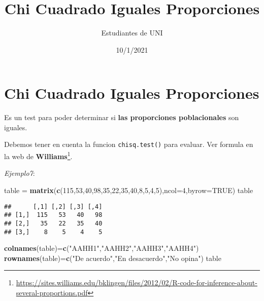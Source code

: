 \documentclass[
]{article}
\title{Chi Cuadrado Iguales Proporciones}
\author{Estudiantes de UNI}
\date{10/1/2021}
\newenvironment{Shaded}{\begin{snugshade}}{\end{snugshade}}
\newcommand{\DataTypeTok}[1]{\textcolor[rgb]{0.13,0.29,0.53}{#1}}
\newcommand{\DecValTok}[1]{\textcolor[rgb]{0.00,0.00,0.81}{#1}}
\newcommand{\KeywordTok}[1]{\textcolor[rgb]{0.13,0.29,0.53}{\textbf{#1}}}
\newcommand{\NormalTok}[1]{#1}
\newcommand{\OtherTok}[1]{\textcolor[rgb]{0.56,0.35,0.01}{#1}}
\newcommand{\StringTok}[1]{\textcolor[rgb]{0.31,0.60,0.02}{#1}}
\begin{document}
\maketitle

\hypertarget{chi-cuadrado-iguales-proporciones}{%
\section{Chi Cuadrado Iguales
Proporciones}\label{chi-cuadrado-iguales-proporciones}}

Es un test para poder determinar si \textbf{las proporciones
poblacionales} son iguales.

Debemos tener en cuenta la funcion \texttt{chisq.test()} para evaluar.
Ver formula en la web de \textbf{Williams}\footnote{\url{https://sites.williams.edu/bklingen/files/2012/02/R-code-for-inference-about-several-proportions.pdf}}.

\emph{Ejemplo7}:

\begin{Shaded}
\begin{Highlighting}[]
\NormalTok{table =}\StringTok{ }\KeywordTok{matrix}\NormalTok{(}\KeywordTok{c}\NormalTok{(}\DecValTok{115}\NormalTok{,}\DecValTok{53}\NormalTok{,}\DecValTok{40}\NormalTok{,}\DecValTok{98}\NormalTok{,}\DecValTok{35}\NormalTok{,}\DecValTok{22}\NormalTok{,}\DecValTok{35}\NormalTok{,}\DecValTok{40}\NormalTok{,}\DecValTok{8}\NormalTok{,}\DecValTok{5}\NormalTok{,}\DecValTok{4}\NormalTok{,}\DecValTok{5}\NormalTok{),}\DataTypeTok{ncol=}\DecValTok{4}\NormalTok{,}\DataTypeTok{byrow=}\OtherTok{TRUE}\NormalTok{)}
\NormalTok{table}
\end{Highlighting}
\end{Shaded}

\begin{verbatim}
##      [,1] [,2] [,3] [,4]
## [1,]  115   53   40   98
## [2,]   35   22   35   40
## [3,]    8    5    4    5
\end{verbatim}

\newpage

\begin{Shaded}
\begin{Highlighting}[]
\KeywordTok{colnames}\NormalTok{(table)=}\KeywordTok{c}\NormalTok{(}\StringTok{"AAHH1"}\NormalTok{,}\StringTok{"AAHH2"}\NormalTok{,}\StringTok{"AAHH3"}\NormalTok{,}\StringTok{"AAHH4"}\NormalTok{)}
\KeywordTok{rownames}\NormalTok{(table)=}\KeywordTok{c}\NormalTok{(}\StringTok{"De acuerdo"}\NormalTok{,}\StringTok{"En desacuerdo"}\NormalTok{,}\StringTok{"No opina"}\NormalTok{)}
\NormalTok{table}
\end{Highlighting}
\end{Shaded}
\end{document}
